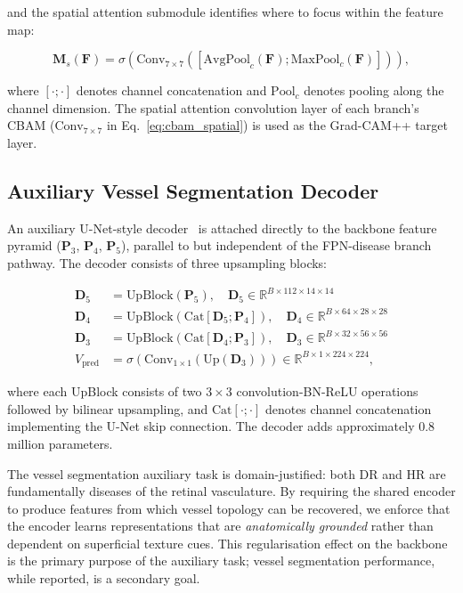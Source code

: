 \documentclass[review,12pt]{elsarticle}
\begin{document}
and the spatial attention submodule identifies where to focus within the
feature map:

\begin{equation}
  \mathbf{M}_s(\mathbf{F}) = \sigma\!\left(\text{Conv}_{7\times7}\!\left(
  [\text{AvgPool}_c(\mathbf{F});\text{MaxPool}_c(\mathbf{F})]\right)\right),
  \label{eq:cbam_spatial}
\end{equation}

where $[\cdot;\cdot]$ denotes channel concatenation and $\text{Pool}_c$
denotes pooling along the channel dimension. The spatial attention convolution
layer of each branch's CBAM ($\text{Conv}_{7\times7}$ in
Eq.~\ref{eq:cbam_spatial}) is used as the Grad-CAM++ target layer.

\subsection{Auxiliary Vessel Segmentation Decoder}

An auxiliary U-Net-style decoder~\cite{ronneberger2015} is attached directly
to the backbone feature pyramid ($\mathbf{P}_3$, $\mathbf{P}_4$, $\mathbf{P}_5$),
parallel to but independent of the FPN-disease branch pathway. The decoder
consists of three upsampling blocks:

\begin{align}
  \mathbf{D}_5 &= \text{UpBlock}(\mathbf{P}_5), \quad \mathbf{D}_5 \in
  \mathbb{R}^{B \times 112 \times 14 \times 14} \label{eq:dec1}\\
  \mathbf{D}_4 &= \text{UpBlock}(\text{Cat}[\mathbf{D}_5;\mathbf{P}_4]), \quad
  \mathbf{D}_4 \in \mathbb{R}^{B \times 64 \times 28 \times 28} \label{eq:dec2}\\
  \mathbf{D}_3 &= \text{UpBlock}(\text{Cat}[\mathbf{D}_4;\mathbf{P}_3]), \quad
  \mathbf{D}_3 \in \mathbb{R}^{B \times 32 \times 56 \times 56} \label{eq:dec3}\\
  V_{\text{pred}} &= \sigma\!\left(\text{Conv}_{1\times1}(\text{Up}(\mathbf{D}_3))\right)
  \in \mathbb{R}^{B \times 1 \times 224 \times 224}, \label{eq:dec4}
\end{align}

where each UpBlock consists of two $3 \times 3$ convolution-BN-ReLU operations
followed by bilinear upsampling, and $\text{Cat}[\cdot;\cdot]$ denotes channel
concatenation implementing the U-Net skip connection. The decoder adds
approximately 0.8 million parameters.

The vessel segmentation auxiliary task is domain-justified: both DR and HR
are fundamentally diseases of the retinal vasculature. By requiring the shared
encoder to produce features from which vessel topology can be recovered, we
enforce that the encoder learns representations that are \textit{anatomically
grounded} rather than dependent on superficial texture cues. This regularisation
effect on the backbone is the primary purpose of the auxiliary task; vessel
segmentation performance, while reported, is a secondary goal.
\end{document}
